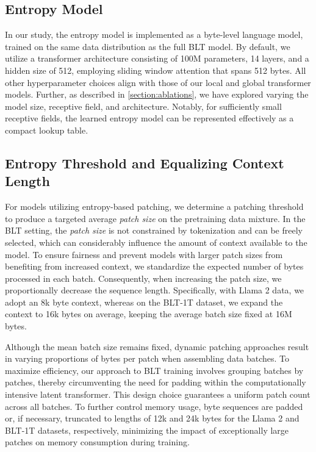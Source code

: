 \subsection{Entropy Model} In our study, the entropy model is implemented as a byte-level language model, trained on the same data distribution as the full {\textsc BLT} model. By default, we utilize a transformer architecture consisting of 100M parameters, 14 layers, and a hidden size of 512, employing sliding window attention that spans 512 bytes. All other hyperparameter choices align with those of our local and global transformer models. Further, as described in \autoref{section:ablations}, we have explored varying the model size, receptive field, and architecture. Notably, for sufficiently small receptive fields, the learned entropy model can be represented effectively as a compact lookup table.

\subsection{Entropy Threshold and Equalizing Context Length} For models utilizing entropy-based patching, we determine a patching threshold to produce a targeted average \textit{patch size} on the pretraining data mixture. In the {\textsc BLT} setting, the \textit{patch size} is not constrained by tokenization and can be freely selected, which can considerably influence the amount of context available to the model. To ensure fairness and prevent models with larger patch sizes from benefiting from increased context, we standardize the expected number of bytes processed in each batch. Consequently, when increasing the patch size, we proportionally decrease the sequence length. Specifically, with Llama 2 data, we adopt an 8k byte context, whereas on the {\textsc BLT}-1T dataset, we expand the context to 16k bytes on average, keeping the average batch size fixed at 16M bytes.

Although the mean batch size remains fixed, dynamic patching approaches result in varying proportions of bytes per patch when assembling data batches. To maximize efficiency, our approach to {\textsc BLT} training involves grouping batches by patches, thereby circumventing the need for padding within the computationally intensive latent transformer. This design choice guarantees a uniform patch count across all batches. To further control memory usage, byte sequences are padded or, if necessary, truncated to lengths of 12k and 24k bytes for the Llama 2 and {\textsc BLT}-1T datasets, respectively, minimizing the impact of exceptionally large patches on memory consumption during training.

